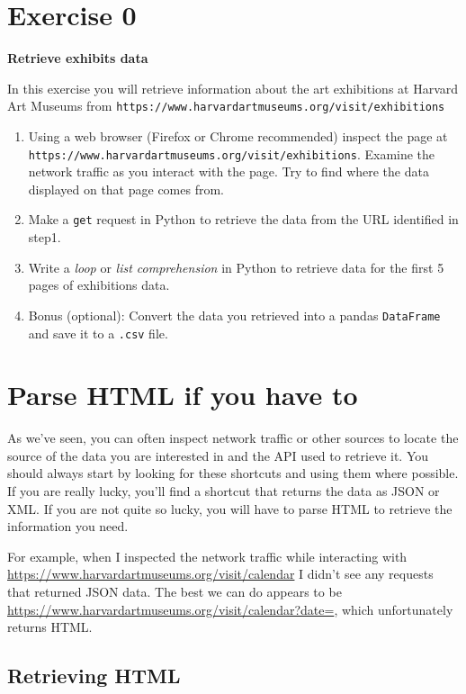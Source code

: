 \documentclass[]{book}
\providecommand{\tightlist}{%
  \setlength{\itemsep}{0pt}\setlength{\parskip}{0pt}}
\begin{document}
\section{Exercise 0}\label{exercise-0-5}

\textbf{Retrieve exhibits data}

In this exercise you will retrieve information about the art exhibitions
at Harvard Art Museums from
\texttt{https://www.harvardartmuseums.org/visit/exhibitions}

\begin{enumerate}
\def\labelenumi{\arabic{enumi}.}
\tightlist
\item
  Using a web browser (Firefox or Chrome recommended) inspect the page
  at \texttt{https://www.harvardartmuseums.org/visit/exhibitions}.
  Examine the network traffic as you interact with the page. Try to find
  where the data displayed on that page comes from.
\item
  Make a \texttt{get} request in Python to retrieve the data from the
  URL identified in step1.
\item
  Write a \emph{loop} or \emph{list comprehension} in Python to retrieve
  data for the first 5 pages of exhibitions data.
\item
  Bonus (optional): Convert the data you retrieved into a pandas
  \texttt{DataFrame} and save it to a \texttt{.csv} file.
\end{enumerate}

\section{Parse HTML if you have to}\label{parse-html-if-you-have-to}

As we've seen, you can often inspect network traffic or other sources to
locate the source of the data you are interested in and the API used to
retrieve it. You should always start by looking for these shortcuts and
using them where possible. If you are really lucky, you'll find a
shortcut that returns the data as JSON or XML. If you are not quite so
lucky, you will have to parse HTML to retrieve the information you need.

For example, when I inspected the network traffic while interacting with
\url{https://www.harvardartmuseums.org/visit/calendar} I didn't see any
requests that returned JSON data. The best we can do appears to be
\url{https://www.harvardartmuseums.org/visit/calendar?date=}, which
unfortunately returns HTML.

\subsection{Retrieving HTML}\label{retrieving-html}
\end{document}
